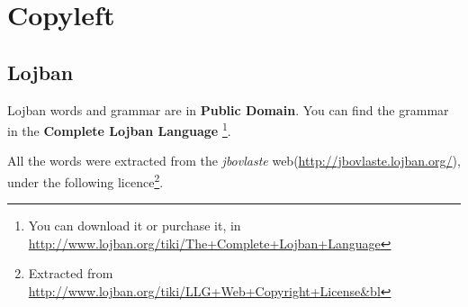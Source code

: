 \documentclass[ipa,twoside]{report}
\begin{document}
\label{cha:enloj}
\begin{multicols}{2}
%

\end{multicols}

\chapter*{Copyleft}

\pagestyle{plain}

\section*{Lojban}

Lojban words and grammar are in \textbf{Public Domain}. You can find the grammar in the \textbf{Complete Lojban Language}%
\footnote{You can download it or purchase it, in \url{http://www.lojban.org/tiki/The+Complete+Lojban+Language}}.

All the words were extracted from the \textsl{jbovlaste} web(\url{http://jbovlaste.lojban.org/}), under the following licence\footnote{Extracted from \url{http://www.lojban.org/tiki/LLG+Web+Copyright+License&bl}}.
\end{document}
